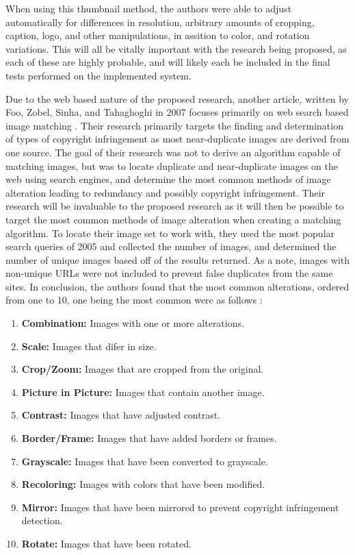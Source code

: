 \documentclass[11pt]{article}
\begin{document}
When using this thumbnail method, the authors were able to adjust automatically for differences in resolution, arbitrary amounts of cropping, caption, logo, and other manipulations, in assition to color, and rotation variations. This will all be vitally important with the research being proposed, as each of these are highly probable, and will likely each be included in the final tests performed on the implemented system.

Due to the web based nature of the proposed research, another article, written by Foo, Zobel, Sinha, and Tahaghoghi in 2007 focuses primarily on web search based image matching \cite{Foo:2007}. Their research primarily targets the finding and determination of types of copyright infringement as most near-duplicate images are derived from one source. The goal of their research was not to derive an algorithm capable of matching images, but was to locate duplicate and near-duplicate images on the web using search engines, and determine the most common methods of image alteration leading to redundancy and possibly copyright infringement. Their research will be invaluable to the proposed research as it will then be possible to target the most common methods of image alteration when creating a matching algorithm. To locate their image set to work with, they used the most popular search queries of 2005 and collected the number of images, and determined the number of unique images based off of the results returned. As a note, images with non-unique URLs were not included to prevent false duplicates from the same sites. In conclusion, the authors found that the most common alterations, ordered from one to 10, one being the most common were as follows \cite{Foo:2007}:
\begin{enumerate}
\item
\textbf{Combination:} Images with one or more alterations.
\item
\textbf{Scale:} Images that difer in size.
\item
\textbf{Crop/Zoom:} Images that are cropped from the original.
\item
\textbf{Picture in Picture:} Images that contain another image.
\item
\textbf{Contrast:} Images that have adjusted contrast.
\item
\textbf{Border/Frame:} Images that have added borders or frames.
\item
\textbf{Grayscale:} Images that have been converted to grayscale.
\item
\textbf{Recoloring:} Images with colors that have been modified.
\item
\textbf{Mirror:} Images that have been mirrored to prevent copyright infringement detection.
\item
\textbf{Rotate:} Images that have been rotated.
\end{enumerate}
\end{document}
